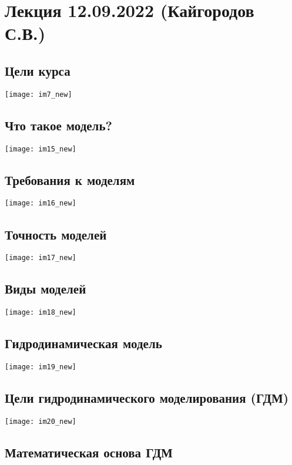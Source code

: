 \documentclass[main.tex]{subfiles}
\begin{document}
\section{Лекция 12.09.2022 (Кайгородов С.В.)}

\subsection{Цели курса}

\texttt{[image: im7\_new]}

\subsection{Что такое модель?}

\texttt{[image: im15\_new]}

\subsection{Требования к моделям}

\texttt{[image: im16\_new]}

\subsection{Точность моделей}

\texttt{[image: im17\_new]}

\subsection{Виды моделей}

\texttt{[image: im18\_new]}

\subsection{Гидродинамическая модель}

\texttt{[image: im19\_new]}

\subsection{Цели гидродинамического моделирования (ГДМ)}

\texttt{[image: im20\_new]}

\subsection{Математическая основа ГДМ}
\end{document}
